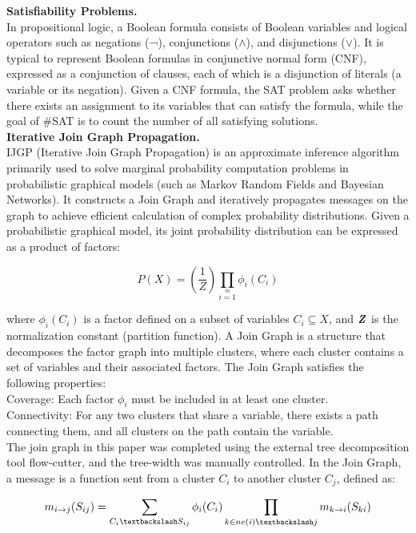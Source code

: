 \textbf{Satisfiability Problems.\\} 
In propositional logic, a Boolean formula consists of Boolean variables and logical operators 
such as negations (¬), conjunctions ($ \land $), and disjunctions ($\lor$). It is typical to 
represent Boolean formulas in conjunctive normal form (CNF), expressed as a conjunction of clauses, 
each of which is a disjunction of literals (a variable or its negation). Given a CNF formula, 
the SAT problem asks whether there exists an assignment to its variables that can satisfy the 
formula, while the goal of \#SAT is to count the number of all satisfying solutions.\\

\textbf{Iterative Join Graph Propagation.\\}
IJGP (Iterative Join Graph Propagation) is an approximate inference algorithm primarily used to 
solve marginal probability computation problems in probabilistic graphical models (such as Markov 
Random Fields and Bayesian Networks). It constructs a Join Graph and iteratively propagates messages 
on the graph to achieve efficient calculation of complex probability distributions.
Given a probabilistic graphical model, its joint probability distribution can be expressed as a 
product of factors:

\begin{equation}
P(X)=\left(\frac{1}{Z}\right)\prod\limits_{i=1}\limits^m\phi_i(C_i)
\end{equation}

where \(\phi_i(C_i)\) is a factor defined on a subset of variables \(C_i\subseteq X\), and
\(\textbf{\textit{Z}}\) is the normalization constant (partition function).
A Join Graph is a structure that decomposes the factor graph into multiple clusters, where each 
cluster contains a set of variables and their associated factors. The Join Graph satisfies the 
following properties:\\
Coverage: Each factor \(\phi_i\) must be included in at least one cluster.\\
Connectivity: For any two clusters that share a variable, there exists a path connecting them, 
and all clusters on the path contain the variable.\\
The join graph in this paper was completed using the external tree decomposition tool flow-cutter, 
and the tree-width was manually controlled.
In the Join Graph, a message is a function sent from a cluster \(C_i\) to another cluster \(C_j\), 
defined as:

\begin{equation}
m_{i\rightarrow j}(S_{ij})=\sum\limits_{C_i\textbackslash S_{ij}}\phi_i(C_i)
\prod\limits_{k\in ne(i)\textbackslash j}m_{k\rightarrow i}(S_{ki})
\end{equation}

